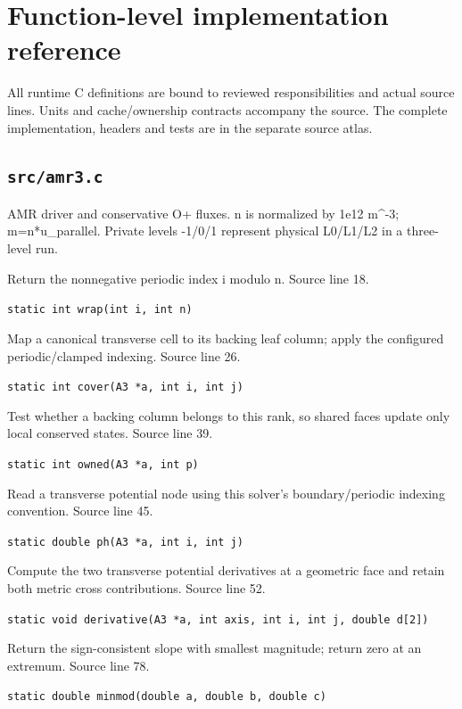 \section{Function-level implementation reference}
All runtime C definitions are bound to reviewed responsibilities and actual source lines. Units and cache/ownership contracts accompany the source. The complete implementation, headers and tests are in the separate source atlas.
\subsection{\texttt{src/amr3.c}}
AMR driver and conservative O+ fluxes. n is normalized by 1e12 m\textasciicircum{}-3; m=n*u\_parallel. Private levels -1/0/1 represent physical L0/L1/L2 in a three-level run.
\begin{description}[style=nextline,leftmargin=0pt,labelindent=0pt,labelwidth=0pt,labelsep=0pt]
\item[\texttt{wrap}] Return the nonnegative periodic index i modulo n. Source line 18.\par
{\small\nolinkurl{static int wrap(int i, int n)}}
\item[\texttt{cover}] Map a canonical transverse cell to its backing leaf column; apply the configured periodic/clamped indexing. Source line 26.\par
{\small\nolinkurl{static int cover(A3 *a, int i, int j)}}
\item[\texttt{owned}] Test whether a backing column belongs to this rank, so shared faces update only local conserved states. Source line 39.\par
{\small\nolinkurl{static int owned(A3 *a, int p)}}
\item[\texttt{ph}] Read a transverse potential node using this solver's boundary/periodic indexing convention. Source line 45.\par
{\small\nolinkurl{static double ph(A3 *a, int i, int j)}}
\item[\texttt{derivative}] Compute the two transverse potential derivatives at a geometric face and retain both metric cross contributions. Source line 52.\par
{\small\nolinkurl{static void derivative(A3 *a, int axis, int i, int j, double d[2])}}
\item[\texttt{minmod}] Return the sign-consistent slope with smallest magnitude; return zero at an extremum. Source line 78.\par
{\small\nolinkurl{static double minmod(double a, double b, double c)}}

\end{description}
